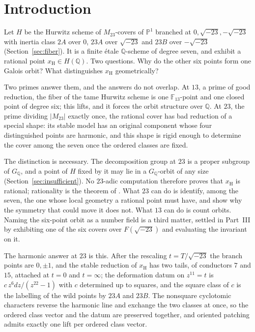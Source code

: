 \documentclass[11pt]{amsart}
\newcommand{\QQ}{\mathbb{Q}}
\newcommand{\FF}{\mathbb{F}}
\newcommand{\PP}{\mathbb{P}}
\newcommand{\GQ}{G_{\QQ}}
\newcommand{\Mtw}{M_{23}}
\newcommand{\sqm}{\sqrt{-23}}
\newcommand{\xH}{x_{\mathrm H}}
\theoremstyle{plain}
\theoremstyle{definition}
\begin{document}
\section{Introduction}\label{sec:intro}

Let $H$ be the Hurwitz scheme of $\Mtw$-covers of $\PP^1$ branched at
$0,\sqm,-\sqm$ with inertia class $2A$ over $0$, $23A$ over $\sqm$ and
$23B$ over $-\sqm$ (Section~\ref{sec:fiber}). It is a finite \'etale
$\QQ$-scheme of degree seven, and \cite{HJLPPZ} exhibit a rational
point $\xH\in H(\QQ)$. Two questions. Why do the other six points form
one Galois orbit? What distinguishes $\xH$ geometrically?

Two primes answer them, and the answers do not overlap. At $13$, a
prime of good reduction, the fiber of the tame Hurwitz scheme is one
$\FF_{13}$-point and one closed point of degree six; this lifts, and
it forces the orbit structure over $\QQ$. At $23$, the prime dividing
$|\Mtw|$ exactly once, the rational cover has bad reduction of a
special shape: its stable model has an original component whose four
distinguished points are harmonic, and this shape is rigid enough to
determine the cover among the seven once the ordered classes are fixed.

The distinction is necessary. The decomposition group at $23$ is a
proper subgroup of $\GQ$, and a point of $H$ fixed by it may lie in a
$\GQ$-orbit of any size (Section~\ref{sec:insufficient}). No $23$-adic
computation therefore proves that $\xH$ is rational; rationality is
the theorem of \cite{HJLPPZ}. What $23$ can do is identify, among the
seven, the one whose local geometry a rational point must have, and
show why the symmetry that could move it does not. What $13$ can do is
count orbits. Naming the six-point orbit as a number field is a third
matter, settled in Part~III by exhibiting one of the six covers over
$F(\sqm)$ and evaluating the invariant on it.

The harmonic answer at $23$ is this. After the rescaling
$t=T/\sqm$ the branch points are $0,\pm1$, and the stable reduction of
$\xH$ has two tails, of conductors $7$ and $15$, attached at $t=0$ and
$t=\infty$; the deformation datum on $z^{11}=t$ is
$c\,z^6dz/(z^{22}-1)$ with $c$ determined up to squares, and the
square class of $c$ is the labelling of the wild points by $23A$ and
$23B$. The nonsquare cyclotomic characters reverse the harmonic line
and exchange the two classes at once, so the ordered class vector and
the datum are preserved together, and oriented patching admits exactly
one lift per ordered class vector.
\end{document}
